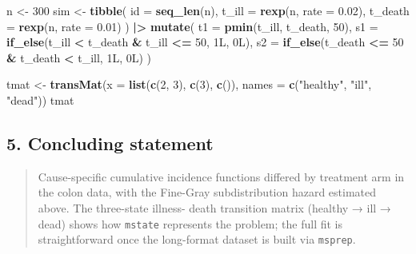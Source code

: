 \documentclass[
]{article}
\newenvironment{Shaded}{\begin{snugshade}}{\end{snugshade}}
\newcommand{\AttributeTok}[1]{\textcolor[rgb]{0.13,0.29,0.53}{#1}}
\newcommand{\DataTypeTok}[1]{\textcolor[rgb]{0.13,0.29,0.53}{#1}}
\newcommand{\DecValTok}[1]{\textcolor[rgb]{0.00,0.00,0.81}{#1}}
\newcommand{\FloatTok}[1]{\textcolor[rgb]{0.00,0.00,0.81}{#1}}
\newcommand{\FunctionTok}[1]{\textcolor[rgb]{0.13,0.29,0.53}{\textbf{#1}}}
\newcommand{\NormalTok}[1]{#1}
\newcommand{\OtherTok}[1]{\textcolor[rgb]{0.56,0.35,0.01}{#1}}
\newcommand{\SpecialCharTok}[1]{\textcolor[rgb]{0.81,0.36,0.00}{\textbf{#1}}}
\newcommand{\StringTok}[1]{\textcolor[rgb]{0.31,0.60,0.02}{#1}}
\begin{document}
\begin{Shaded}
\begin{Highlighting}[]
\NormalTok{n }\OtherTok{\textless{}{-}} \DecValTok{300}
\NormalTok{sim }\OtherTok{\textless{}{-}} \FunctionTok{tibble}\NormalTok{(}
  \AttributeTok{id =} \FunctionTok{seq\_len}\NormalTok{(n),}
  \AttributeTok{t\_ill   =} \FunctionTok{rexp}\NormalTok{(n, }\AttributeTok{rate =} \FloatTok{0.02}\NormalTok{),}
  \AttributeTok{t\_death =} \FunctionTok{rexp}\NormalTok{(n, }\AttributeTok{rate =} \FloatTok{0.01}\NormalTok{)}
\NormalTok{) }\SpecialCharTok{|\textgreater{}}
  \FunctionTok{mutate}\NormalTok{(}
    \AttributeTok{t1 =} \FunctionTok{pmin}\NormalTok{(t\_ill, t\_death, }\DecValTok{50}\NormalTok{),}
    \AttributeTok{s1 =} \FunctionTok{if\_else}\NormalTok{(t\_ill }\SpecialCharTok{\textless{}}\NormalTok{ t\_death }\SpecialCharTok{\&}\NormalTok{ t\_ill }\SpecialCharTok{\textless{}=} \DecValTok{50}\NormalTok{, }\DecValTok{1}\DataTypeTok{L}\NormalTok{, }\DecValTok{0}\DataTypeTok{L}\NormalTok{),}
    \AttributeTok{s2 =} \FunctionTok{if\_else}\NormalTok{(t\_death }\SpecialCharTok{\textless{}=} \DecValTok{50} \SpecialCharTok{\&}\NormalTok{ t\_death }\SpecialCharTok{\textless{}}\NormalTok{ t\_ill, }\DecValTok{1}\DataTypeTok{L}\NormalTok{, }\DecValTok{0}\DataTypeTok{L}\NormalTok{)}
\NormalTok{  )}

\NormalTok{tmat }\OtherTok{\textless{}{-}} \FunctionTok{transMat}\NormalTok{(}\AttributeTok{x =} \FunctionTok{list}\NormalTok{(}\FunctionTok{c}\NormalTok{(}\DecValTok{2}\NormalTok{, }\DecValTok{3}\NormalTok{), }\FunctionTok{c}\NormalTok{(}\DecValTok{3}\NormalTok{), }\FunctionTok{c}\NormalTok{()),}
                 \AttributeTok{names =} \FunctionTok{c}\NormalTok{(}\StringTok{"healthy"}\NormalTok{, }\StringTok{"ill"}\NormalTok{, }\StringTok{"dead"}\NormalTok{))}
\NormalTok{tmat}
\end{Highlighting}
\end{Shaded}

\subsection{5. Concluding statement}\label{concluding-statement}

\begin{quote}
Cause-specific cumulative incidence functions differed by treatment arm
in the colon data, with the Fine-Gray subdistribution hazard estimated
above. The three-state illness- death transition matrix (healthy → ill →
dead) shows how \texttt{mstate} represents the problem; the full fit is
straightforward once the long-format dataset is built via
\texttt{msprep}.
\end{quote}
\end{document}
